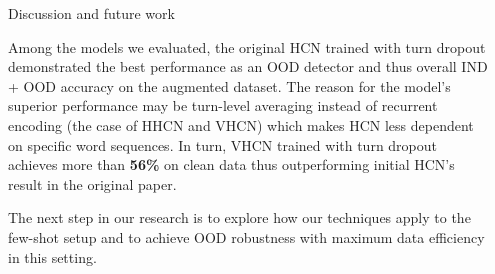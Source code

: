 \documentclass[final]{beamer}
\newlength{\sepwidth}
\newlength{\colwidth}
\newlength{\doublecolwidth}
\newcommand{\separatorcolumn}{\begin{column}{\sepwidth}\end{column}}
\begin{document}
\begin{frame}[t]
\begin{columns}[t]
\begin{column}{\doublecolwidth}
\begin{columns}[t,totalwidth=\doublecolwidth]
\begin{column}{\colwidth}
\begin{block}{Discussion and future work}

Among the models we evaluated, the original HCN trained with turn dropout demonstrated the best performance as an OOD detector and thus overall IND + OOD accuracy on the augmented dataset. The reason for the model's superior performance may be turn-level averaging instead of recurrent encoding (the case of HHCN and VHCN) which makes HCN less dependent on specific word sequences. In turn, VHCN trained with turn dropout achieves more than \textbf{56\%} on clean data thus outperforming initial HCN's result in the original paper.

The next step in our research is to explore how our techniques apply to the few-shot setup and to achieve OOD robustness with maximum data efficiency in this setting.
\end{block}

%
\end{column}

\end{columns}
\end{column}

\separatorcolumn

\end{columns}


\end{frame}
\end{document}
